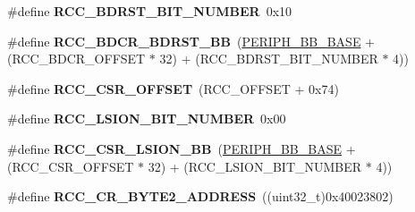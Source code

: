 \begin{DoxyCompactItemize}
\item 
\#define {\bfseries R\+C\+C\+\_\+\+B\+D\+R\+S\+T\+\_\+\+B\+I\+T\+\_\+\+N\+U\+M\+B\+ER}~0x10\hypertarget{group___r_c_c___bit_address___alias_region_ga68b0f7a13e733453c7efcd66a6ee251d}{}\label{group___r_c_c___bit_address___alias_region_ga68b0f7a13e733453c7efcd66a6ee251d}

\item 
\#define {\bfseries R\+C\+C\+\_\+\+B\+D\+C\+R\+\_\+\+B\+D\+R\+S\+T\+\_\+\+BB}~(\hyperlink{group___peripheral__memory__map_gaed7efc100877000845c236ccdc9e144a}{P\+E\+R\+I\+P\+H\+\_\+\+B\+B\+\_\+\+B\+A\+SE} + (R\+C\+C\+\_\+\+B\+D\+C\+R\+\_\+\+O\+F\+F\+S\+ET $\ast$ 32) + (R\+C\+C\+\_\+\+B\+D\+R\+S\+T\+\_\+\+B\+I\+T\+\_\+\+N\+U\+M\+B\+ER $\ast$ 4))\hypertarget{group___r_c_c___bit_address___alias_region_ga5e5805d3c5b9ad3ebc13e030e5fdd86c}{}\label{group___r_c_c___bit_address___alias_region_ga5e5805d3c5b9ad3ebc13e030e5fdd86c}

\item 
\#define {\bfseries R\+C\+C\+\_\+\+C\+S\+R\+\_\+\+O\+F\+F\+S\+ET}~(R\+C\+C\+\_\+\+O\+F\+F\+S\+ET + 0x74)\hypertarget{group___r_c_c___bit_address___alias_region_ga63141585a221eed1fd009eb80e406619}{}\label{group___r_c_c___bit_address___alias_region_ga63141585a221eed1fd009eb80e406619}

\item 
\#define {\bfseries R\+C\+C\+\_\+\+L\+S\+I\+O\+N\+\_\+\+B\+I\+T\+\_\+\+N\+U\+M\+B\+ER}~0x00\hypertarget{group___r_c_c___bit_address___alias_region_ga577ffeb20561aa8395fe5327807b5709}{}\label{group___r_c_c___bit_address___alias_region_ga577ffeb20561aa8395fe5327807b5709}

\item 
\#define {\bfseries R\+C\+C\+\_\+\+C\+S\+R\+\_\+\+L\+S\+I\+O\+N\+\_\+\+BB}~(\hyperlink{group___peripheral__memory__map_gaed7efc100877000845c236ccdc9e144a}{P\+E\+R\+I\+P\+H\+\_\+\+B\+B\+\_\+\+B\+A\+SE} + (R\+C\+C\+\_\+\+C\+S\+R\+\_\+\+O\+F\+F\+S\+ET $\ast$ 32) + (R\+C\+C\+\_\+\+L\+S\+I\+O\+N\+\_\+\+B\+I\+T\+\_\+\+N\+U\+M\+B\+ER $\ast$ 4))\hypertarget{group___r_c_c___bit_address___alias_region_gac34a2d63deae3efc65e66f8fb3c26dae}{}\label{group___r_c_c___bit_address___alias_region_gac34a2d63deae3efc65e66f8fb3c26dae}

\item 
\#define {\bfseries R\+C\+C\+\_\+\+C\+R\+\_\+\+B\+Y\+T\+E2\+\_\+\+A\+D\+D\+R\+E\+SS}~((uint32\+\_\+t)0x40023802)\hypertarget{group___r_c_c___bit_address___alias_region_ga1da336203f39dd57462e7f331271f699}{}\label{group___r_c_c___bit_address___alias_region_ga1da336203f39dd57462e7f331271f699}


\end{DoxyCompactItemize}
